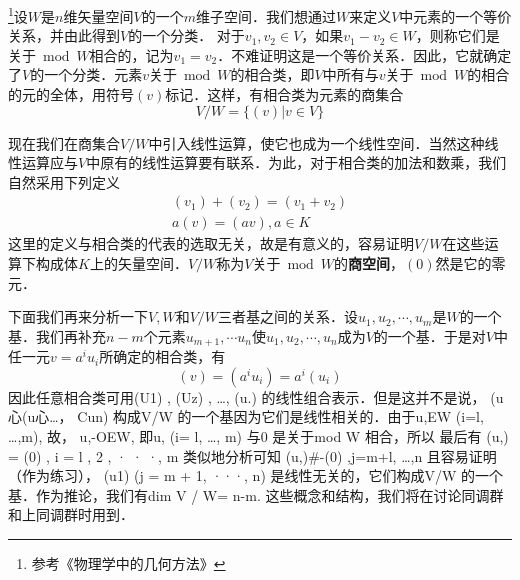 

\footnote{参考《物理学中的几何方法》}设$W$是$n$维矢量空间$V$的一个$m$维子空间．我们想通过$W$来定义$V$中元素的一个等价关系，并由此得到$V$的一个分类．
对于$v_1,v_2\in V$，如果$v_1-v_2\in W$，则称它们是关于$\bmod W $相合的，记为$v_1=v_2$．不难证明这是一个等价关系．因此，它就确定了$V $的一个分类．元素$v $关于$\bmod W $的相合类，即$V $中所有与$v $关于$\bmod W $的相合的元的全体，用符号$(v) $标记．这样，有相合类为元素的商集合
\begin{equation}
V / W=\{(v) | v \in V\}
\end{equation}

现在我们在商集合$V/W $中引入线性运算，使它也成为一个线性空间．当然这种线性运算应与$V $中原有的线性运算要有联系．为此，对于相合类的加法和数乘，我们自然采用下列定义
\begin{equation}
\begin{array}{l}\left(v_{1}\right)+\left(v_{2}\right)=\left(v_{1}+v_{2}\right) \\ a(v)=(a v), a \in K\end{array}
\end{equation}
这里的定义与相合类的代表的选取无关，故是有意义的，容易证明$V/W $在这些运算下构成体$K $上的矢量空间．$V/W $称为$V $关于$\bmod W$的\textbf{商空间}，$(0)$然是它的零元．

下面我们再来分析一下$V,W$和$V/W $三者基之间的关系．设$u_1,u_2,\cdots,u_m$是$W $的一个基．我们再补充$n- m$个元素${u}_{m+1}, \cdots {u}_{n}$使$u_{1}, u_{2}, \cdots, u_{n}$成为$V$的一个基．于是对$V $中任一元$v=a^iu_i$所确定的相合类，有
\begin{equation}
(v)=\left(a^{i} u_{i}\right)=a^{i}\left(u_{i}\right)
\end{equation}
因此任意相合类可用(U1) , (Uz) , …, (u.) 的线性组合表示．但是这并不是说，
(u心(u心…， Cun) 构成V/W 的一个基因为它们是线性相关的．由于u,EW
(i=l, …,m), 故， u,-OEW, 即u, (i= l, …, m) 与0 是关于mod W 相合，所以
最后有
(u,) = (0) , i = l , 2 , · · ·, m
类似地分析可知
(u,)#-(0) ,j=m+l, …,n
且容易证明（作为练习）， (u1) (j = m + 1, ···, n) 是线性无关的，它们构成V/W
的一个基．作为推论，我们有dim V / W= n-m.
这些概念和结构，我们将在讨论同调群和上同调群时用到．